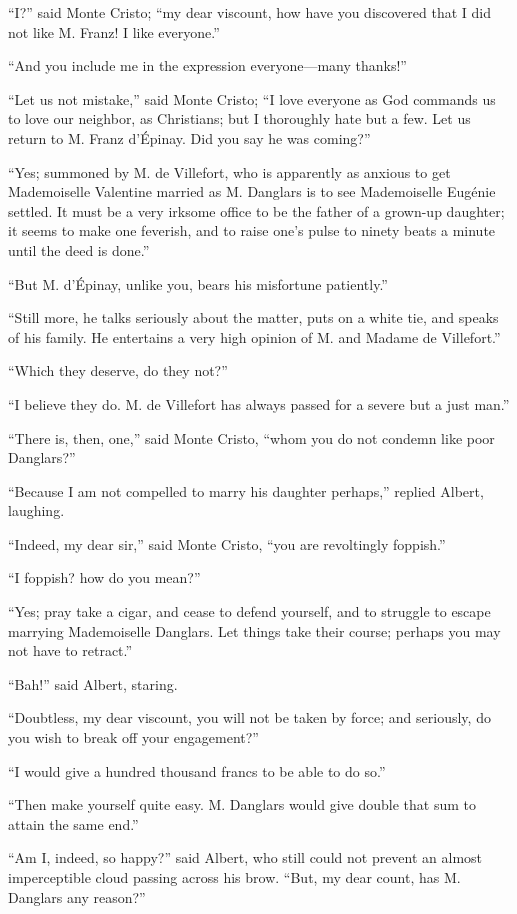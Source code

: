 “I?” said Monte Cristo; “my dear viscount, how have you discovered that
I did not like M. Franz! I like everyone.”

“And you include me in the expression everyone—many thanks!”

“Let us not mistake,” said Monte Cristo; “I love everyone as God
commands us to love our neighbor, as Christians; but I thoroughly hate
but a few. Let us return to M. Franz d’Épinay. Did you say he was
coming?”

“Yes; summoned by M. de Villefort, who is apparently as anxious to get
Mademoiselle Valentine married as M. Danglars is to see Mademoiselle
Eugénie settled. It must be a very irksome office to be the father of a
grown-up daughter; it seems to make one feverish, and to raise one’s
pulse to ninety beats a minute until the deed is done.”

“But M. d’Épinay, unlike you, bears his misfortune patiently.”

“Still more, he talks seriously about the matter, puts on a white tie,
and speaks of his family. He entertains a very high opinion of M. and
Madame de Villefort.”

“Which they deserve, do they not?”

“I believe they do. M. de Villefort has always passed for a severe but
a just man.”

“There is, then, one,” said Monte Cristo, “whom you do not condemn like
poor Danglars?”

“Because I am not compelled to marry his daughter perhaps,” replied
Albert, laughing.

“Indeed, my dear sir,” said Monte Cristo, “you are revoltingly
foppish.”

“I foppish? how do you mean?”

“Yes; pray take a cigar, and cease to defend yourself, and to struggle
to escape marrying Mademoiselle Danglars. Let things take their course;
perhaps you may not have to retract.”

“Bah!” said Albert, staring.

“Doubtless, my dear viscount, you will not be taken by force; and
seriously, do you wish to break off your engagement?”

“I would give a hundred thousand francs to be able to do so.”

“Then make yourself quite easy. M. Danglars would give double that sum
to attain the same end.”

“Am I, indeed, so happy?” said Albert, who still could not prevent an
almost imperceptible cloud passing across his brow. “But, my dear
count, has M. Danglars any reason?”

